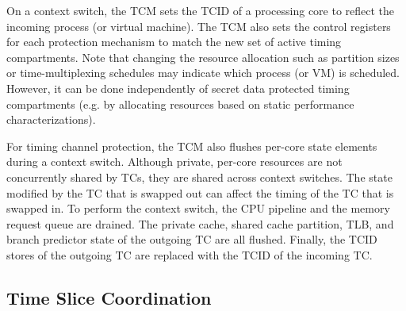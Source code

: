 On a context switch, the TCM sets the TCID of a processing core to reflect
the incoming process (or virtual machine). The TCM also sets the control
registers for each protection mechanism to match the new set of active
timing compartments. Note that changing the resource allocation such as
partition sizes or time-multiplexing schedules may indicate
which process (or VM) is scheduled. However, it can be done independently
of secret data protected timing compartments (e.g. by allocating resources 
based on static performance characterizations).

For timing channel protection, the TCM also flushes per-core state elements
during a context switch.
Although private, per-core resources are not concurrently shared by TCs, they 
are shared across context switches. The state modified by the TC that is 
swapped out can affect the timing of the TC that is swapped in.
To perform the context switch, the CPU pipeline and the memory request queue 
are drained. 
The private cache, shared cache 
partition, TLB, and branch predictor state of the outgoing TC are all flushed.  
Finally, the TCID stores of the outgoing TC are replaced with the TCID of the 
incoming TC. 


\subsection{Time Slice Coordination}
\label{sec:coordination}

